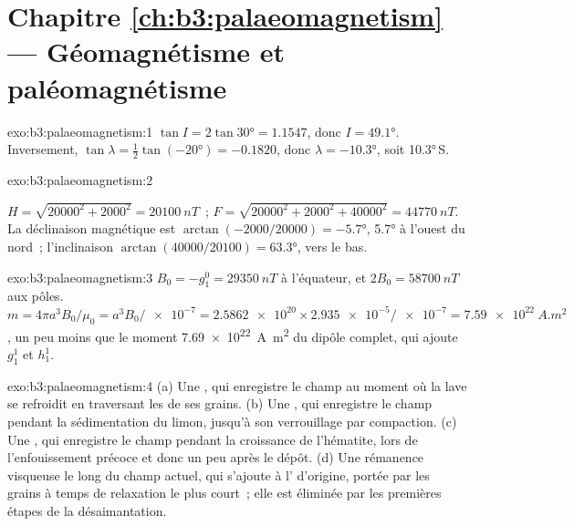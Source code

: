 \section*{Chapitre \ref{ch:b3:palaeomagnetism} --- Géomagnétisme et paléomagnétisme}

\begin{solution}{exo:b3:palaeomagnetism:1}
$\tan I = 2\tan\ang{30} = 1.1547$, donc $I = \ang{49.1}$. Inversement, $\tan\lambda
= \tfrac12\tan(\ang{-20}) = -0.1820$, donc $\lambda = \ang{-10.3}$, soit
\ang{10.3}\,S.
\end{solution}

\begin{solution}{exo:b3:palaeomagnetism:2}
{\sloppy $H = \sqrt{20000^2 + 2000^2} = \qty{20100}{nT}$~;
$F = \sqrt{20000^2 + 2000^2 + 40000^2} = \qty{44770}{nT}$. La déclinaison
magnétique est $\arctan(-2000/20000) = \ang{-5.7}$, \ang{5.7} à l'ouest du nord~;
l'inclinaison $\arctan(40000/20100) = \ang{63.3}$, vers le bas.\par}
\end{solution}

\begin{solution}{exo:b3:palaeomagnetism:3}
$B_0 = -g_1^0 = \qty{29350}{nT}$ à l'équateur, et $2B_0 = \qty{58700}{nT}$ aux
pôles. $m = 4\pi a^3B_0/\mu_0 = a^3B_0/\num{e-7} = \num{2.5862e20}\times
\num{2.935e-5}/\num{e-7} = \qty{7.59e22}{A.m^2}$, un peu moins que le moment
\qty{7.69e22}{A.m^2} du dipôle complet, qui ajoute $g_1^1$ et $h_1^1$.
\end{solution}

\begin{solution}{exo:b3:palaeomagnetism:4}
(a) Une , qui enregistre le champ au moment où la lave
se refroidit en traversant les  de ses grains. (b) Une ,
qui enregistre le champ pendant la sédimentation du limon,
jusqu'à son verrouillage par compaction. (c) Une , qui enregistre le
champ pendant la croissance de l'hématite, lors de l'enfouissement précoce et donc un peu
après le dépôt. (d) Une rémanence visqueuse le long du champ actuel, qui s'ajoute
à l' d'origine, portée par les grains à temps de relaxation le plus court~; elle
est éliminée par les premières étapes de la désaimantation.
\end{solution}

